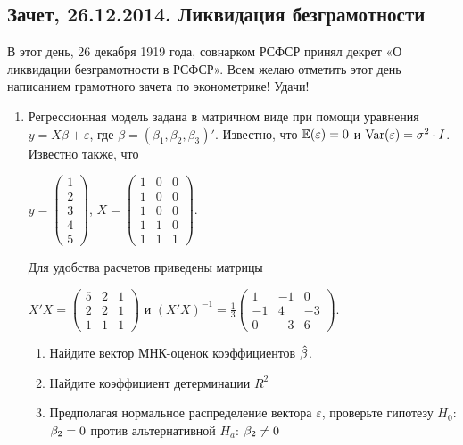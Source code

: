 \documentclass[12pt, a4paper]{article}\usepackage[]{graphicx}\usepackage[]{color}
\begin{document}
\subsection{Зачет, 26.12.2014. Ликвидация безграмотности}

В этот день, 26 декабря 1919 года, совнарком РСФСР принял декрет «О ликвидации безграмотности в РСФСР». Всем желаю отметить этот день написанием грамотного зачета по эконометрике! Удачи!

\begin{enumerate}
\item Регрессионная модель  задана в матричном виде при помощи уравнения $y=X\beta+\varepsilon$, где $\beta=(\beta_1,\beta_2,\beta_3)'$.
Известно, что $\mathbb{E}(\varepsilon)=0$  и  $\operatorname{Var}(\varepsilon)=\sigma^2\cdot I$.
Известно также, что

$y=\left(
\begin{array}{c}
1\\
2\\
3\\
4\\
5
\end{array}\right)$,
$X=\left(\begin{array}{ccc}
1 & 0 & 0 \\
1 & 0 & 0 \\
1 & 0 & 0 \\
1 & 1 & 0 \\
1 & 1 & 1
\end{array}\right)$.


Для удобства расчетов приведены матрицы


$X'X=\left(
\begin{array}{ccc}
5 & 2 & 1\\
2 & 2 & 1\\
1 & 1 & 1
\end{array}\right)$ и $(X'X)^{-1}=\frac{1}{3}\left(
\begin{array}{ccc}
1 & -1 & 0 \\
-1 & 4 & -3 \\
0 & -3 & 6
\end{array}\right)$.

\begin{enumerate}
\item Найдите вектор МНК-оценок коэффициентов $\hat{\beta}$.
\item Найдите коэффициент детерминации $R^2$
\item Предполагая нормальное распределение вектора $\varepsilon$, проверьте гипотезу $H_0$: $\beta_2=0$ против альтернативной $H_a$: $\beta_2\neq 0$
\end{enumerate}


\end{enumerate}
\end{document}

